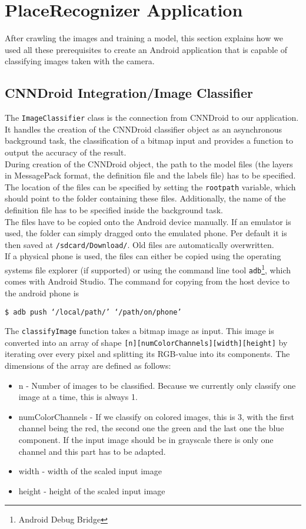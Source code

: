 \section {PlaceRecognizer Application}
After crawling the images and training a model, this section explains how we used all these prerequisites to create an Android application that is capable of classifying images taken with the camera.

\subsection {CNNDroid Integration/Image Classifier}
The \lstinline[language=Java]{ImageClassifier} class is the connection from CNNDroid to our application. It handles the creation of the CNNDroid classifier object as an asynchronous background task, the classification of a bitmap input and provides a function to output the accuracy of the result.\\
During creation of the CNNDroid object, the path to the model files (the layers in MessagePack format, the definition file and the labels file) has to be specified. The location of the files can be specified by setting the \texttt{rootpath} variable, which should point to the folder containing these files. Additionally, the name of the definition file has to be specified inside the background task.\\
The files have to be copied onto the Android device manually. If an emulator is used, the folder can simply dragged onto the emulated phone. Per default it is then saved at \texttt{/sdcard/Download/}. Old files are automatically overwritten.\\
If a physical phone is used, the files can either be copied using the operating systems file explorer (if supported) or using the command line tool \texttt{adb}\footnote{Android Debug Bridge}, which comes with Android Studio. The command for copying from the host device to the android phone is
\begin{center}
    \texttt{\$ adb push `/local/path/' `/path/on/phone'}
\end{center}

The \lstinline[language=Java]{classifyImage} function takes a bitmap image as input. This image is converted into an array of shape \texttt{[n][numColorChannels][width][height]} by iterating over every pixel and splitting its RGB-value into its components. The dimensions of the array are defined as follows:
\begin{itemize}
    \item{n - Number of images to be classified. Because we currently only classify one image at a time, this is always 1.}
    \item{numColorChannels - If we classify on colored images, this is 3, with the first channel being the red, the second one the green and the last one the blue component. If the input image should be in grayscale there is only one channel and this part has to be adapted.}
    \item{width - width of the scaled input image}
    \item{height - height of the scaled input image}
\end{itemize}

